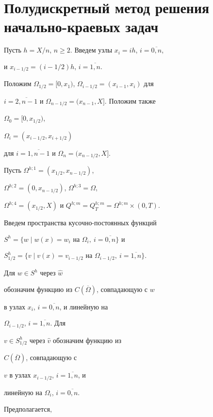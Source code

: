 \section{Полудискретный метод решения начально-краевых задач}





Пусть $h=X/n$, $n\ge 2$. Введем узлы $x_i=ih$, $i=\overline{0,n}$,


и $x_{i-1/2}=(i-1/2)h$, $i=\overline{1,n}$.


Положим $\Omega_{1/2}=[0,x_1)$, $\Omega_{i-1/2}=(x_{i-1},x_i)$ для


$i=\overline{2,n-1}$ и $\Omega_{n-1/2}=(x_{n-1},X]$. Положим также


$\Omega_0=[0,x_{1/2})$,


$\Omega_{i}=(x_{i-1/2},x_{i+1/2})$


для $i=\overline{1,n-1}$ и $\Omega_n=(x_{n-1/2},X]$.


Пусть $\Omega^{h;1}=(x_{1/2},x_{n-1/2})$,


$\Omega^{h;2}=(0,x_{n-1/2})$, $\Omega^{h;3}=\Omega$,


$\Omega^{h;4}=(x_{1/2},X)$ и $Q^{h;m}=Q_T^{h;m}=\Omega^{h;m}\times (0,T)$.





Введем пространства кусочно-постоянных функций


$S^h=


\{w\mid w(x)=w_{i} \text{ на } \Omega_{i},


\ i=\overline{0,n}\}$ и


$S^h_{1/2}=


\{v\mid v(x)=v_{i-1/2}\text{ на }\Omega_{i-1/2},


\ i=\overline{1,n}\}$.


Для $w\in S^h$ через $\widehat w$


обозначим функцию из $C(\overline\Omega)$, совпадающую с $w$


в узлах $x_i$, $i=\overline{0,n}$, и линейную на


$\Omega_{i-1/2}$, $i=\overline{1,n}$. Для


$v\in S^h_{1/2}$ через $\widehat v$ обозначим функцию из


$C(\overline\Omega)$, совпадающую с


$v$ в узлах $x_{i-1/2}$, $i=\overline{1,n}$, и


линейную на $\Omega_i$, $i=\overline{0,n}$.


Предполагается,


